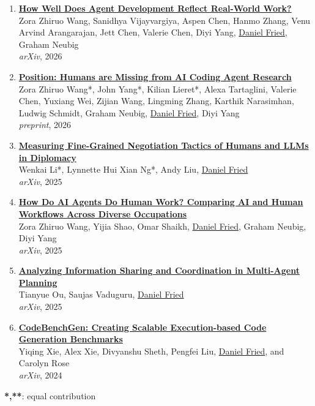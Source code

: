 \begin{enumerate}[leftmargin=-1mm,partopsep=0pt]
\item \href{https://arxiv.org/abs/2603.01203}{\textbf{How Well Does Agent Development Reflect Real-World Work?}} \\
  Zora Zhiruo Wang, Sanidhya Vijayvargiya, Aspen Chen, Hanmo Zhang, Venu Arvind Arangarajan, Jett Chen, Valerie Chen, Diyi Yang, \underline{Daniel Fried}, Graham Neubig\\
  \emph{arXiv}, 2026

\item \href{https://zorazrw.github.io/files/position-haicode.pdf}{\textbf{Position: Humans are Missing from AI Coding Agent Research}} \\
  Zora Zhiruo Wang*, John Yang*, Kilian Lieret*, Alexa Tartaglini, Valerie Chen, Yuxiang Wei, Zijian Wang, Lingming Zhang, Karthik Narasimhan, Ludwig Schmidt, Graham Neubig, \underline{Daniel Fried}, Diyi Yang\\
  \emph{preprint}, 2026

\item \href{https://arxiv.org/abs/2512.18292}{\textbf{Measuring Fine-Grained Negotiation Tactics of Humans and LLMs in Diplomacy}} \\
  Wenkai Li*, Lynnette Hui Xian Ng*, Andy Liu, \underline{Daniel Fried}\\
  \emph{arXiv}, 2025

\item \href{https://arxiv.org/abs/2510.22780}{\textbf{How Do AI Agents Do Human Work? Comparing AI and Human Workflows Across Diverse Occupations}} \\
  Zora Zhiruo Wang, Yijia Shao, Omar Shaikh, \underline{Daniel Fried}, Graham Neubig, Diyi Yang\\
  \emph{arXiv}, 2025

\item \href{https://arxiv.org/abs/2508.12981}{\textbf{Analyzing Information Sharing and Coordination in Multi-Agent Planning}} \\
  Tianyue Ou, Saujas Vaduguru, \underline{Daniel Fried}\\
  \emph{arXiv}, 2025

\item \href{https://arxiv.org/abs/2404.00566}{\textbf{CodeBenchGen: Creating Scalable Execution-based Code Generation Benchmarks}} \\
  Yiqing Xie, Alex Xie, Divyanshu Sheth, Pengfei Liu, \underline{Daniel Fried}, and Carolyn Rose\\
  \emph{arXiv}, 2024

\end{enumerate}

\textbf{*,**}: equal contribution
